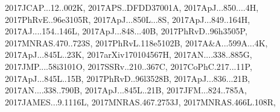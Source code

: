 \documentclass[12pt]{article}
\begin{document}
\begin{description}
{2017JCAP...12..002K,%
2017APS..DFDD37001A,%
2017ApJ...850....4H,%
2017PhRvE..96e3105R,%
2017ApJ...850L...8S,%
2017ApJ...849..164H,%
2017AJ....154..146L,%
2017ApJ...848...40B,%
2017PhRvD..96h3505P,%
2017MNRAS.470..723S,%
2017PhRvL.118e5102B,%
2017A&A...599A...4K,%
2017ApJ...845L..23K,%
2017arXiv170104567H,%
2017AN....338..885G,%
2017JMP....58i3101O,%
2017SSRv..210..367C,%
2017CoPhC.217...11P,%
2017ApJ...845L..15B,%
2017PhRvD..96l3528B,%
2017ApJ...836...21B,%
2017AN....338..790B,%
2017ApJ...845L..21B,%
2017JFM...824..785A,%
2017JAMES...9.1116L,%
2017MNRAS.467.2753J,%
2017MNRAS.466L.108R,%
}
\end{description}
\end{document}
